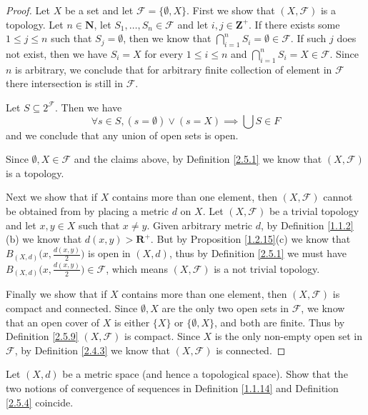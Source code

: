 \begin{proof}
    Let \(X\) be a set and let \(\mathcal{F} = \{\emptyset, X\}\).
    First we show that \((X, \mathcal{F})\) is a topology.
    Let \(n \in \mathbf{N}\), let \(S_1, \dots, S_n \in \mathcal{F}\) and let \(i, j \in \mathbf{Z}^+\).
    If there exists some \(1 \leq j \leq n\) such that \(S_j = \emptyset\), then we know that \(\bigcap_{i = 1}^n S_i = \emptyset \in \mathcal{F}\).
    If such \(j\) does not exist, then we have \(S_i = X\) for every \(1 \leq i \leq n\) and \(\bigcap_{i = 1}^n S_i = X \in \mathcal{F}\).
    Since \(n\) is arbitrary, we conclude that for arbitrary finite collection of element in \(\mathcal{F}\) there intersection is still in \(\mathcal{F}\).

    Let \(S \subseteq 2^{\mathcal{F}}\).
    Then we have
    \[
        \forall s \in S, (s = \emptyset) \lor (s = X) \implies \bigcup S \in F
    \]
    and we conclude that any union of open sets is open.

    Since \(\emptyset, X \in \mathcal{F}\) and the claims above, by Definition \ref{2.5.1} we know that \((X, \mathcal{F})\) is a topology.

    Next we show that if \(X\) contains more than one element, then \((X, \mathcal{F})\) cannot be obtained from by placing a metric \(d\) on \(X\).
    Let \((X, \mathcal{F})\) be a trivial topology and let \(x, y \in X\) such that \(x \neq y\).
    Given arbitrary metric \(d\), by Definition \ref{1.1.2}(b) we know that \(d(x, y) > \mathbf{R}^+\).
    But by Proposition \ref{1.2.15}(c) we know that \(B_{(X, d)}\big(x, \frac{d(x, y)}{2}\big)\) is open in \((X, d)\), thus by Definition \ref{2.5.1} we must have \(B_{(X, d)}\big(x, \frac{d(x, y)}{2}\big) \in \mathcal{F}\), which means \((X, \mathcal{F})\) is a not trivial topology.

    Finally we show that if \(X\) contains more than one element, then \((X, \mathcal{F})\) is compact and connected.
    Since \(\emptyset, X\) are the only two open sets in \(\mathcal{F}\), we know that an open cover of \(X\) is either \(\{X\}\) or \(\{\emptyset, X\}\), and both are finite.
    Thus by Definition \ref{2.5.9} \((X, \mathcal{F})\) is compact.
    Since \(X\) is the only non-empty open set in \(\mathcal{F}\), by Definition \ref{2.4.3} we know that \((X, \mathcal{F})\) is connected.
\end{proof}

\begin{exercise}\label{ex 2.5.2}
    Let \((X, d)\) be a metric space
    (and hence a topological space).
    Show that the two notions of convergence of sequences in Definition \ref{1.1.14} and Definition \ref{2.5.4} coincide.
\end{exercise}


